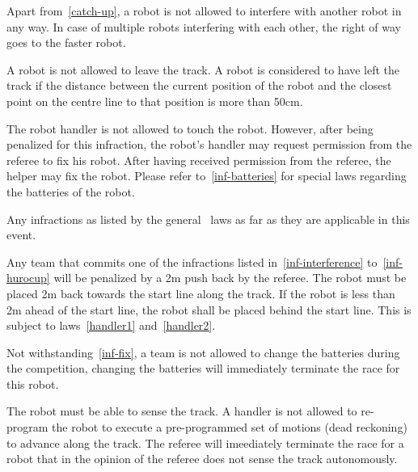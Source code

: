 \documentclass[12pt]{hurocup}
\begin{document}
\begin{lawlist}[MR]

\item \label{inf-interference} Apart from~\ref{catch-up}, a robot is
  not allowed to interfere with another robot in any way. In case of
  multiple robots interfering with each other, the right of way goes
  to the faster robot.

\item A robot is not allowed to leave the track. A robot is considered
  to have left the track if the distance between the current position
  of the robot and the closest point on the centre line to that
  position is more than 50cm.

\item \label{inf-fix} The robot handler is not allowed to touch the
  robot. However, after being penalized for this infraction, the
  robot's handler may request permission from the referee to fix his
  robot. After having received permission from the referee, the helper
  may fix the robot. Please refer to~\ref{inf-batteries} for special
  laws regarding the batteries of the robot.

\item \label{inf-hurocup} Any infractions as listed by the general
  \HuroCup\ laws as far as they are applicable in this event.

\item Any team that commits one of the infractions listed
  in~\ref{inf-interference} to~\ref{inf-hurocup} will be penalized by
  a 2m push back by the referee. The robot must be placed 2m back
  towards the start line along the track. If the robot is less than 2m
  ahead of the start line, the robot shall be placed behind the start
  line. This is subject to laws~\ref{handler1} and~\ref{handler2}.

\item \label{inf-batteries} Not withstanding~\ref{inf-fix}, a team is
  not allowed to change the batteries during the competition, changing
  the batteries will immediately terminate the race for this robot.

\item \label{dead-reckoning} The robot must be able to sense the
  track. A handler is not allowed to re-program the robot to execute a
  pre-programmed set of motions (dead reckoning) to advance along the
  track. The referee will imeediately terminate the race for a robot
  that in the opinion of the referee does not sense the track
  autonomously.

\end{lawlist}
\end{document}
